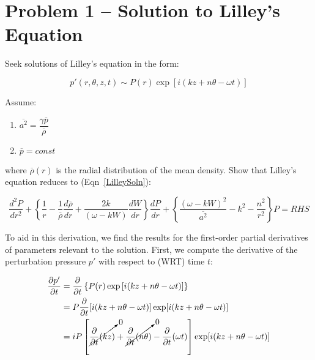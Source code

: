\documentclass[]{aiaa-tc}%
\begin{document}
\section{Problem 1 -- Solution to Lilley's Equation} \label{SecLilley}%

Seek solutions of Lilley's equation in the form:

\begin{equation} \label{SolnForm}
p'(r, \theta, z, t) \sim P(r) \exp\left[ i(kz + n\theta -\omega t) \right]
\end{equation}

\noindent Assume:
\begin{enumerate}
  \item $\overline{a^2} = \dfrac{\gamma \overline{p}}{\overline{\rho}}$
  \item $\overline{p} = const$
\end{enumerate}

\noindent where $\overline{\rho}(r)$ is the radial distribution of the mean density.  Show that Lilley's equation reduces to (Eqn~\ref{LilleySoln}):

\begin{equation} \label{LilleySoln}
\dfrac{d^2 P}{dr^2}
+ \left\{ \dfrac{1}{r}
  - \dfrac{1}{\overline{\rho}} \dfrac{d\overline{\rho}}{dr}
  + \dfrac{2k}{(\omega - kW)} \dfrac{dW}{dr}
\right\} \dfrac{dP}{dr}
+ \left\{ \dfrac{(\omega - kW)^2}{\overline{a^2}} - k^2 - \dfrac{n^2}{r^2}
\right\} P = RHS
\end{equation}

To aid in this derivation, we find the results for the first-order partial derivatives of parameters relevant to the solution.  First, we compute the derivative of the perturbation pressure $p'$ with respect to (WRT) time $t$:

\newcommand\expterm{i(kz + n\theta -\omega t)}%

\begin{align*}
\dfrac{\partial p'}{\partial t} &= \dfrac{\partial}{\partial t}
  \left\{ P(r) \exp\left[ \expterm \right]\right\} \\
&= P \dfrac{\partial}{\partial t} [\expterm] \exp[\expterm] \\
&= iP \left[\cancelto{0}{\dfrac{\partial}{\partial t}(kz)      }
          + \cancelto{0}{\dfrac{\partial}{\partial t}(n\theta)}
                       - \dfrac{\partial}{\partial t}(\omega t)
    \right] \exp[\expterm]
\end{align*}
\end{document}

